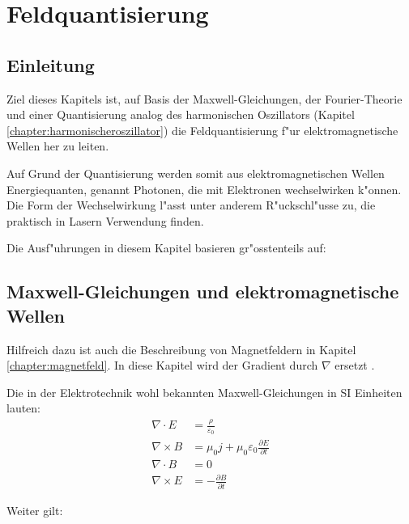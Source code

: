 \chapter{Feldquantisierung\label{chapter:feldquantisierung}}
\begin{refsection}

\printbibliography[heading=subbibliography]
\end{refsection}

\section{Einleitung}

Ziel dieses Kapitels ist, auf Basis der Maxwell-Gleichungen, der Fourier-Theorie und einer Quantisierung analog des harmonischen Oszillators (Kapitel \ref{chapter:harmonischeroszillator}) die Feldquantisierung f"ur elektromagnetische Wellen her zu leiten.

Auf Grund der Quantisierung werden somit aus elektromagnetischen Wellen Energiequanten, genannt Photonen, die mit Elektronen wechselwirken k"onnen. Die Form der Wechselwirkung l"asst unter anderem R"uckschl"usse zu, die praktisch in Lasern Verwendung finden.

Die Ausf"uhrungen in diesem Kapitel basieren gr"osstenteils auf: \cite{fq:aqm}

\section{Maxwell-Gleichungen und elektromagnetische Wellen}

Hilfreich dazu ist auch die Beschreibung von Magnetfeldern in Kapitel \ref{chapter:magnetfeld}. In diese Kapitel wird der Gradient durch $\nabla$ ersetzt \cite{fq:nabla}.

Die in der Elektrotechnik wohl bekannten Maxwell-Gleichungen in SI Einheiten lauten:
\begin{align}
\nabla\cdot E &= \frac{\rho}{\varepsilon_0} \label{fq:maxwell_1}\\
\nabla\times B &= \mu_0 j  + \mu_0 \varepsilon_0\frac{\partial E}{\partial t} \label{fq:maxwell_2}\\
\nabla\cdot B &=0 \label{fq:maxwell_3}\\
\nabla\times E &= -\frac{\partial B }{\partial t} \label{fq:maxwell_4}
\end{align}

Weiter gilt:

